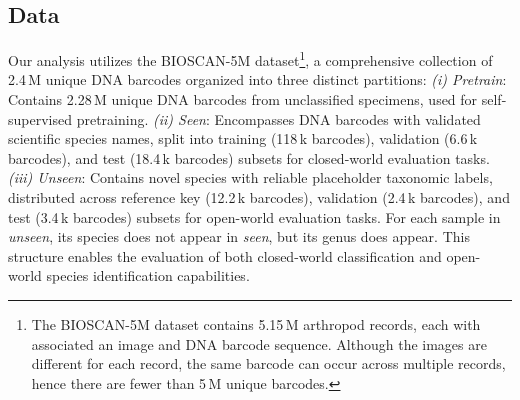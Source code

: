 \subsection{Data \label{sec:data}}
Our analysis utilizes the BIOSCAN-5M dataset\footnote{The BIOSCAN-5M dataset contains 5.15\,M arthropod records, each with associated an image and DNA barcode sequence. Although the images are different for each record, the same barcode can occur across multiple records, hence there are fewer than 5\,M unique barcodes.
}, a comprehensive collection of 2.4\,M unique DNA barcodes organized into three distinct partitions: {\it (i) Pretrain}: Contains 2.28\,M unique DNA barcodes from unclassified specimens, used for self-supervised pretraining. {\it (ii) Seen}: Encompasses DNA barcodes with validated scientific species names, split into training (118\,k barcodes), validation (6.6\,k barcodes), and test (18.4\,k barcodes) subsets for closed-world evaluation tasks. {\it (iii) Unseen}: Contains novel species with reliable placeholder taxonomic labels, distributed across reference key (12.2\,k barcodes), validation (2.4\,k barcodes), and test (3.4\,k barcodes) subsets for open-world evaluation tasks.
For each sample in \textit{unseen}, its species does not appear in \textit{seen}, but its genus does appear.
%
This structure enables the evaluation of both closed-world classification and open-world species identification capabilities.